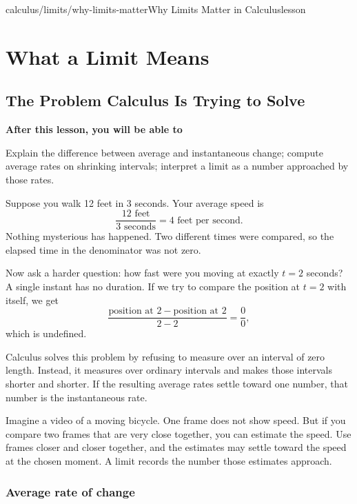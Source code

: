 \documentclass[11pt,openany]{book}
\theoremstyle{bgplain}
\newcommand{\lessonobjective}[1]{%
  \par\Needspace{4\baselineskip}\addvspace{0.6em}%
  {\bfseries\color{BGInk}After this lesson, you will be able to}\par\smallskip
  #1\par\addvspace{0.5em}%
}
\begin{document}

\tableofcontents
\mainmatter

\begin{webpage}{calculus/limits/why-limits-matter}{Why Limits Matter in Calculus}{lesson}
\chapter{What a Limit Means}

\section{The Problem Calculus Is Trying to Solve}

\lessonobjective{
Explain the difference between average and instantaneous change; compute average rates on shrinking intervals; interpret a limit as a number approached by those rates.
}

Suppose you walk 12 feet in 3 seconds. Your average speed is
\[
  \frac{12\text{ feet}}{3\text{ seconds}}=4\text{ feet per second}.
\]
Nothing mysterious has happened. Two different times were compared, so the elapsed time in the denominator was not zero.

Now ask a harder question: how fast were you moving at exactly \(t=2\) seconds? A single instant has no duration. If we try to compare the position at \(t=2\) with itself, we get
\[
  \frac{\text{position at }2-\text{position at }2}{2-2}
  =\frac00,
\]
which is undefined.

Calculus solves this problem by refusing to measure over an interval of zero length. Instead, it measures over ordinary intervals and makes those intervals shorter and shorter. If the resulting average rates settle toward one number, that number is the instantaneous rate.

\begin{bgconcept}
Imagine a video of a moving bicycle. One frame does not show speed. But if you compare two frames that are very close together, you can estimate the speed. Use frames closer and closer together, and the estimates may settle toward the speed at the chosen moment. A limit records the number those estimates approach.
\end{bgconcept}

\subsection{Average rate of change}


\end{webpage}
\end{document}
